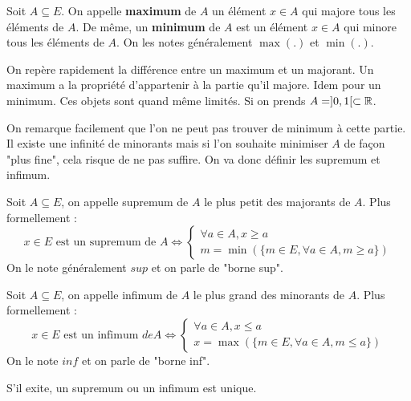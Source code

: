 \begin{definition}
    Soit $A \subseteq E$. On appelle \textbf{maximum} de $A$ un élément $x \in A$ qui majore tous les éléments de $A$. 
    De même, un \textbf{minimum} de $A$ est un élément $x \in A$ qui minore tous les éléments de $A$. 
    On les notes généralement $\max(.)$ et $\min(.)$.
\end{definition}

\begin{remark}
    On repère rapidement la différence entre un maximum et un majorant. Un maximum a la propriété d'appartenir à la partie qu'il majore. 
    Idem pour un minimum. Ces objets sont quand même limités. Si on prends $A = ]0,1[ \subset \mathbb{R}$. 
    
    On remarque facilement 
    que l'on ne peut pas trouver de minimum à cette partie. Il existe une infinité de minorants mais si l'on souhaite minimiser 
    $A$ de façon "plus fine", cela risque de ne pas suffire. On va donc définir les supremum et infimum. 
\end{remark}

\begin{definition}[Supremum]
    Soit $A \subseteq E$, on appelle supremum de $A$ le plus petit des majorants de $A$. 
    Plus formellement :
        \[ x \in E \text{ est un supremum de } A \iff 
            \begin{cases}
                \forall a \in A, x \geqslant a \\
                m = \min(\{m \in E, \forall a \in A, m \geqslant a\})
            \end{cases}
        \]
    On le note généralement $sup$ et on parle de "borne sup". 
\end{definition}

\begin{definition}[Infimum]
    Soit $A \subseteq E$, on appelle infimum de $A$ le plus grand des minorants de $A$. 
    Plus formellement :
        \[ x \in E \text{ est un infimum } de A \iff 
            \begin{cases}
                \forall a \in A, x \leqslant a \\
                x = \max(\{m \in E, \forall a \in A, m \leqslant a\})
            \end{cases}
        \] 
    On le note $inf$ et on parle de "borne inf". 
\end{definition}

\begin{proposition}
    S'il exite, un supremum ou un infimum est unique. 
\end{proposition}

